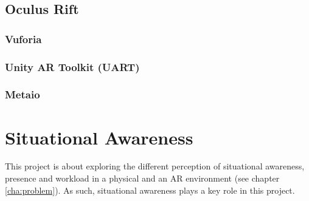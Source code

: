 		\subsection{Oculus Rift} \label{ssec:oculusrift}
			\subsubsection{Vuforia} \label{sssec:vuforia}
			\subsubsection{Unity AR Toolkit (UART)} \label{sssec:uart}
			\subsubsection{Metaio} \label{sssec:metaio}
	
	
	\section{Situational Awareness} \label{sec:awareness}
		This project is about exploring the different perception of situational 
		awareness, presence and workload in a physical and an AR environment 
		(see chapter \ref{cha:problem}). As such, situational awareness plays a 
		key role in this project.
		
